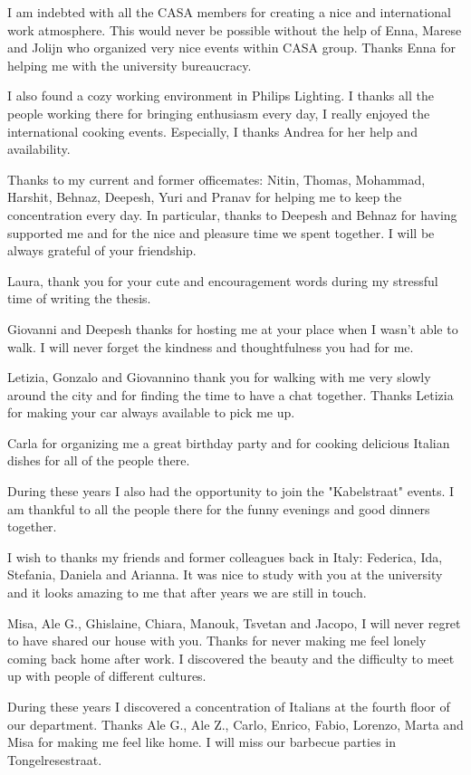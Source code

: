 I am indebted with all the CASA members for creating a nice and international work atmosphere. This would never be possible without the help of Enna, Marese and Jolijn who organized very nice events within CASA group. Thanks Enna for helping me with the university bureaucracy.

I also found a cozy working environment in Philips Lighting. I thanks all the people working there for bringing enthusiasm every day, I really enjoyed the international cooking events. Especially, I thanks Andrea for her help and availability.

Thanks to my current and former officemates: Nitin, Thomas, Mohammad, Harshit, Behnaz, Deepesh, Yuri and Pranav for helping me to keep the concentration every day.
In particular, thanks to Deepesh and Behnaz for having supported me and for the nice and pleasure time we spent together. I will be always grateful of your friendship. 

Laura, thank you for your cute and encouragement words during my stressful time of writing the thesis.

Giovanni and Deepesh thanks for hosting me at your place when I wasn't able to walk. I will never forget the kindness and thoughtfulness you had for me.


Letizia, Gonzalo and Giovannino thank you for walking with me very slowly around the city and for finding the time to have a chat together. Thanks Letizia for making your car always available to pick me up.

Carla for organizing me a great birthday party and for cooking delicious Italian dishes for all of the people there.

During these years I also had the opportunity to join the "Kabelstraat" events. I am thankful to all the people there for the funny evenings and good dinners together.

I wish to thanks my friends and former colleagues back in Italy: Federica, Ida, Stefania, Daniela and Arianna. It was nice to study with you at the university and it looks amazing to me that after years we are still in touch.

Misa, Ale G., Ghislaine, Chiara, Manouk, Tsvetan and Jacopo, I will never regret to have shared our house with you. Thanks for never making me feel lonely coming back home after work. I discovered the beauty and the difficulty to meet up with people of different cultures.

During these years I discovered a concentration of Italians at the fourth floor of our department. Thanks Ale G., Ale Z., Carlo, Enrico, Fabio, Lorenzo, Marta and Misa for making me feel like home. I will miss our barbecue parties in Tongelresestraat.

